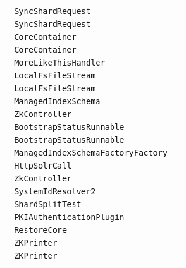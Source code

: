 \begin{center}
\begin{tabular}{ll}
\lstinline/ SyncShardRequest/&\raisebox{0pt}{\lstinline/   handleUpdates(ShardResponse)/}\\ 
\lstinline/ SyncShardRequest/&\raisebox{0pt}{\lstinline/   handleUpdates(ShardResponse)/}\\ 
\lstinline/ CoreContainer/&\raisebox{0pt}{\lstinline/   swap(String,String)/}\\ 
\lstinline/ CoreContainer/&\raisebox{0pt}{\lstinline/   swap(String,String)/}\\ 
\lstinline/ MoreLikeThisHandler/&\raisebox{0pt}{\lstinline/   handleRequestBody(SolrQueryRequestr,SolrQueryResponser)/}\\ 
\lstinline/ LocalFsFileStream/&\raisebox{0pt}{\lstinline/   write(out)/}\\ 
\lstinline/ LocalFsFileStream/&\raisebox{0pt}{\lstinline/   write(out)/}\\ 
\lstinline/ ManagedIndexSchema/&\raisebox{0pt}{\lstinline/   newFieldType(StringtypeName,StringclassName)/}\\ 
\lstinline/ ZkController/&\raisebox{0pt}{\lstinline/   publishNodeAsDown(String)/}\\ 
\lstinline/ BootstrapStatusRunnable/&\raisebox{0pt}{\lstinline/   sendBootstrapCommand()/}\\ 
\lstinline/ BootstrapStatusRunnable/&\raisebox{0pt}{\lstinline/   sendBootstrapCommand()/}\\ 
\lstinline/ ManagedIndexSchemaFactoryFactory/&\raisebox{0pt}{\lstinline/   zkUgradeToManagedSchema()/}\\ 
\lstinline/ HttpSolrCall/&\raisebox{0pt}{\lstinline/   writeResponse(SolrQueryResponse,QueryResponseWriter,Method)/}\\ 
\lstinline/ ZkController/&\raisebox{0pt}{\lstinline/   publishNodeAsDown(String)/}\\ 
\lstinline/ SystemIdResolver2/&\raisebox{0pt}{\lstinline/   solveEntity(Stringname,StringId,String)/}\\ 
\lstinline/ ShardSplitTest/&\raisebox{0pt}{\lstinline/   logDebugHelp(int[]))/}\\ 
\lstinline/ PKIAuthenticationPlugin/&\raisebox{0pt}{\lstinline/   PublicKeygetRemotePublicKey(String)/}\\ 
\lstinline/ RestoreCore/&\raisebox{0pt}{\lstinline/   booleandoRestore()/}\\ 
\lstinline/ ZKPrinter/&\raisebox{0pt}{\lstinline/   booleanprintZnode(J)/}\\ 
\lstinline/ ZKPrinter/&\raisebox{0pt}{\lstinline/   printZnode(JSONWriter)/}\\ 

\end{tabular}
\end{center}
